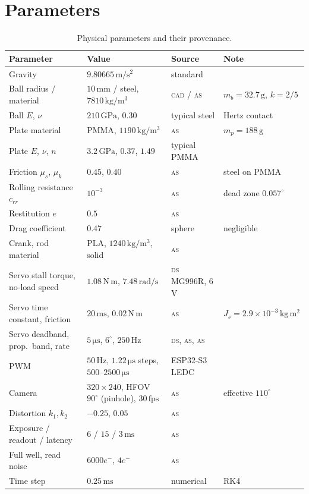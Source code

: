 \documentclass[10pt,a4paper]{article}
\newcommand{\un}[1]{\,\mathrm{#1}}
\newcommand{\tagCAD}{\textsc{cad}}
\newcommand{\tagDS}{\textsc{ds}}
\newcommand{\tagAS}{\textsc{as}}
\begin{document}
\section{Parameters}\label{sec:params}
\begin{table}[h]
\centering
\caption{Physical parameters and their provenance.}
\label{tab:params}
\footnotesize
\setlength{\tabcolsep}{4pt}
\begin{tabular}{llll}
\toprule
Parameter & Value & Source & Note\\
\midrule
Gravity & $9.80665\un{m/s^2}$ & standard & \\
Ball radius / material & $10\un{mm}$ / steel, $7810\un{kg/m^3}$ & \tagCAD{} / \tagAS & $m_b=32.7\un{g}$, $k=2/5$\\
Ball $E$, $\nu$ & $210\un{GPa}$, $0.30$ & typical steel & Hertz contact\\
Plate material & PMMA, $1190\un{kg/m^3}$ & \tagAS & $m_p=188\un{g}$\\
Plate $E$, $\nu$, $n$ & $3.2\un{GPa}$, $0.37$, $1.49$ & typical PMMA & \\
Friction $\mu_s$, $\mu_k$ & $0.45$, $0.40$ & \tagAS & steel on PMMA\\
Rolling resistance $c_{rr}$ & $10^{-3}$ & \tagAS & dead zone $0.057^\circ$\\
Restitution $e$ & $0.5$ & \tagAS & \\
Drag coefficient & $0.47$ & sphere & negligible\\
Crank, rod material & PLA, $1240\un{kg/m^3}$, solid & \tagAS & \\
Servo stall torque, no-load speed & $1.08\un{N\,m}$, $7.48\un{rad/s}$ & \tagDS{} MG996R, 6 V & \\
Servo time constant, friction & $20\un{ms}$, $0.02\un{N\,m}$ & \tagAS & $J_s=2.9\times10^{-3}\un{kg\,m^2}$\\
Servo deadband, prop.\ band, rate & $5\un{\mu s}$, $6^\circ$, $250\un{Hz}$ & \tagDS, \tagAS, \tagAS & \\
PWM & $50\un{Hz}$, $1.22\un{\mu s}$ steps, $500$--$2500\un{\mu s}$ & ESP32-S3 LEDC & \\
Camera & $320\times240$, HFOV $90^\circ$ (pinhole), $30\un{fps}$ & \tagAS & effective $110^\circ$\\
Distortion $k_1,k_2$ & $-0.25$, $0.05$ & \tagAS & \\
Exposure / readout / latency & $6$ / $15$ / $3\un{ms}$ & \tagAS & \\
Full well, read noise & $6000e^-$, $4e^-$ & \tagAS & \\
Time step & $0.25\un{ms}$ & numerical & RK4\\
\bottomrule
\end{tabular}
\end{table}



\end{document}

